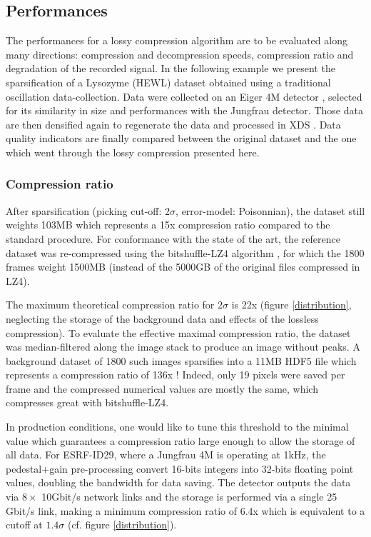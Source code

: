 \documentclass[preprint]{iucr}              %
\begin{document}
\subsection{Performances}
The performances for a lossy compression algorithm are to be evaluated along many directions: compression and decompression speeds, compression ratio and degradation of the recorded signal.
In the following example we present the sparsification of a Lysozyme (HEWL) dataset obtained using a traditional oscillation data-collection. 
Data were collected on an Eiger 4M detector \cite{lysozyme}, selected for its similarity in size and performances with the Jungfrau detector.
Those data are then densified again to regenerate the data and processed in XDS \cite{xds}.
Data quality indicators are finally compared between the original dataset and the one which went through the lossy compression presented here.


\subsubsection{Compression ratio} 
After sparsification (picking cut-off: $2\sigma$, error-model: Poisonnian), the dataset still weights 103MB which represents a 15x compression ratio compared to the standard procedure.
For conformance with the state of the art, the reference dataset was re-compressed using the bitshuffle-LZ4 algorithm \cite{bitshuffle}, for which the 1800 frames weight 1500MB (instead of the 5000GB of the original files compressed in LZ4).

The maximum theoretical compression ratio for $2\sigma$ is 22x (figure \ref{distribution}, neglecting the storage of the background data and effects of the lossless compression).
To evaluate the effective maximal compression ratio, the dataset was median-filtered along the image stack to produce an image without peaks. 
A background dataset of 1800 such images sparsifies into a 11MB HDF5 file which represents a compression ratio of 136x ! 
Indeed, only 19 pixels were saved per frame and the compressed numerical values are mostly the same, which compresses great with bitshuffle-LZ4.

In production conditions, one would like to tune this threshold to the minimal value which guarantees a compression ratio large enough to allow the storage of all data.
For ESRF-ID29, where a Jungfrau 4M is operating at 1kHz, the pedestal+gain pre-processing convert 16-bits integers into 32-bits floating point values, doubling the bandwidth for data saving. 
The detector outputs the data via $8\times$ 10Gbit/s network links and the storage is performed via a single 25 Gbit/s link, making a minimum compression ratio of 6.4x which is equivalent to a cutoff at $1.4\sigma$ (cf. figure \ref{distribution}).
\end{document}

